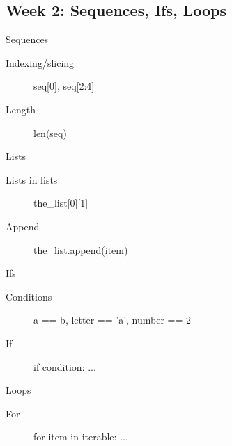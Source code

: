 \documentclass[aspectratio=169,usenames,dvipsnames]{beamer}
\begin{document}
\subsection{Week 2: Sequences, Ifs, Loops}
\begin{frame}[fragile]{Sequences}
    \begin{description}
        \item[Indexing/slicing] seq[0], seq[2:4]
        \item[Length] len(seq)
    \end{description}
\end{frame}
\begin{frame}[fragile]{Lists}
    \begin{description}
        \item[Lists in lists] the\_list[0][1]
        \item[Append] the\_list.append(item)
    \end{description}
\end{frame}
\begin{frame}[fragile]{Ifs}
    \begin{description}
        \item[Conditions] a == b, letter == 'a', number == 2
        \item[If] if condition: ...
    \end{description}
\end{frame}
\begin{frame}[fragile]{Loops}
    \begin{description}
        \item[For] for item in iterable: ...
    \end{description}
\end{frame}
\end{document}

